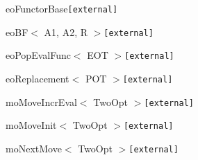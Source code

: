 \begin{CompactList}
\begin{CompactList}
\item {}
\end{CompactList}
\item eo\-Functor\-Base{\tt  \mbox{[}external\mbox{]}}\begin{CompactList}
\item eo\-BF$<$ A1, A2, R $>${\tt  \mbox{[}external\mbox{]}}\begin{CompactList}
\item eo\-Pop\-Eval\-Func$<$ EOT $>${\tt  \mbox{[}external\mbox{]}}\begin{CompactList}
\item {}
\end{CompactList}
\item eo\-Replacement$<$ POT $>${\tt  \mbox{[}external\mbox{]}}\begin{CompactList}
\item {}
\item {}
\end{CompactList}
\item mo\-Move\-Incr\-Eval$<$ Two\-Opt $>${\tt  \mbox{[}external\mbox{]}}\begin{CompactList}
\item {}
\end{CompactList}
\item mo\-Move\-Init$<$ Two\-Opt $>${\tt  \mbox{[}external\mbox{]}}\begin{CompactList}
\item {}
\end{CompactList}
\item mo\-Next\-Move$<$ Two\-Opt $>${\tt  \mbox{[}external\mbox{]}}\begin{CompactList}
\item {}
\end{CompactList}
\item {}
\begin{CompactList}

\end{CompactList}
\end{CompactList}
\end{CompactList}
\end{CompactList}
